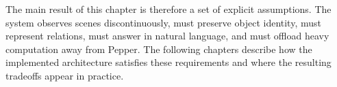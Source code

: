 The main result of this chapter is therefore a set of explicit assumptions. The system observes scenes discontinuously, must preserve object identity, must represent relations, must answer in natural language, and must offload heavy computation away from Pepper. The following chapters describe how the implemented architecture satisfies these requirements and where the resulting tradeoffs appear in practice.
